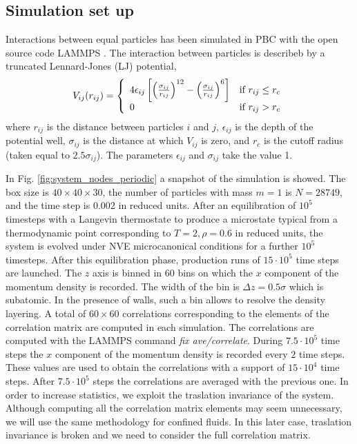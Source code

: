 \documentclass[b5paper,openright,11pt]{book}
\begin{document}
\subsection{Simulation set up}
\label{Sec:SimSetUpPBC}
Interactions between equal particles has been simulated in PBC with the open source code LAMMPS \cite{Plimpton1995}. The interaction between particles is describeb by a truncated Lennard-Jones (LJ) potential,
\begin{align}
  V_{ij}(r_{ij}) = \left\lbrace
  \begin{array}{ll}
    4\epsilon_{ij}\left[\left(\frac{\sigma_{ij}}{r_{ij}}\right)^{12}-\left(\frac{\sigma_{ij}}{r_{ij}}\right)^6\right] & \textup{if } r_{ij}\leq r_c \\
    0 & \textup{if } r_{ij}>r_c
  \end{array}
  \right.
  \label{LJ}
\end{align}
where $r_{ij}$ is the distance between particles $i$ and $j$, $\epsilon_{ij}$ is the depth of the potential well, $\sigma_{ij}$ is the distance at which $V_{ij}$ is zero, and $r_c$ is the cutoff radius (taken equal to $2.5\sigma_{ij}$). The parameters $\epsilon_{ij}$ and $\sigma_{ij}$ take the value 1. 

In Fig. \ref{fig:system_nodes_periodic} a snapshot of the simulation is showed.
The box  size is $40\times40\times30$, the  number of particles with mass $m=1$
is $N=28749$, and the time step is $0.002$ in reduced units.  After an
equilibration  of  $10^5$ timesteps  with  a  Langevin thermostate  to
produce a microstate typical  from a thermodynamic point corresponding
to $T=2,\rho=0.6$ in  reduced units, the system is  evolved under NVE
microcanonical conditions for a  further $10^5$ timesteps.  After this
equilibration  phase,  production  runs   of  $15\cdot 10^5$  time  steps  are
launched.   The $z$  axis is  binned  in $60$  bins on  which the  $x$
component of the momentum density is recorded.  The
width of the  bin is $\Delta z=0.5\sigma$ which is  subatomic.  In the
presence of walls,  such a bin allows to resolve  the density layering.  A total of $60\times  60$ correlations corresponding to the
elements of  the correlation matrix  are computed in  each simulation.
The correlations are computed with the LAMMPS command {\it fix ave/correlate}. During $7.5\cdot 10^5$ time steps the $x$ component of the momentum density is recorded every $2$ time steps. These values are used to obtain the correlations with a support of $15\cdot10^4$ time steps. %
After $7.5\cdot 10^5$ steps the correlations are averaged with the previous one. 
In  order to  increase  statistics,  we 
exploit   the   traslation   invariance   of   the
system.  Although computing  all the  correlation matrix  elements may
seem  unnecessary,  we will  use  the  same methodology  for  confined
fluids. In  this later  case, traslation invariance  is broken  and we
need to consider the full correlation matrix.
\end{document}
